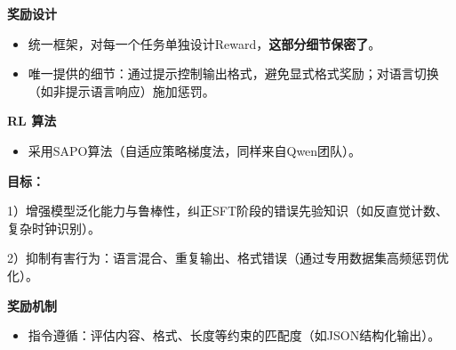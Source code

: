 \documentclass[zihao=false,fontset=windows]{ctexart}
\begin{document}
\textbf{奖励设计}\par

\begin{itemize}[label=\textcolor{feishuBlue}{\textbullet}]
\item 统一框架，对每一个任务单独设计Reward，\textcolor{feishuRed}{\textbf{这部分细节保密了}}。

\end{itemize}

\begin{itemize}[label=\textcolor{feishuBlue}{\textbullet}]
\item 唯一提供的细节：通过提示控制输出格式，避免显式格式奖励；对语言切换（如非提示语言响应）施加惩罚。

\end{itemize}

\textbf{RL 算法}\par

\begin{itemize}[label=\textcolor{feishuBlue}{\textbullet}]
\item 采用SAPO算法（自适应策略梯度法，同样来自Qwen团队）。

\end{itemize}


\Needspace{2cm}\par\vspace{0.9em}\par\vspace{0.28em}

\begin{feishuquote}
\textbf{目标：}\par

1）增强模型泛化能力与鲁棒性，纠正SFT阶段的错误先验知识（如反直觉计数、复杂时钟识别）。\par

2）抑制有害行为：语言混合、重复输出、格式错误（通过专用数据集高频惩罚优化）。\par

\end{feishuquote}

\textbf{奖励机制}\par

\begin{itemize}[label=\textcolor{feishuBlue}{\textbullet}]
\item 指令遵循：评估内容、格式、长度等约束的匹配度（如JSON结构化输出）。

\end{itemize}
\end{document}
